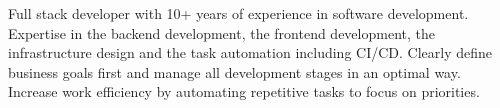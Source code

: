 

\begin{cvparagraph}

Full stack developer with 10+ years of experience in software development.
Expertise in the backend development, the frontend development, the infrastructure design and the task automation including CI/CD.
Clearly define business goals first and manage all development stages in an optimal way.
Increase work efficiency by automating repetitive tasks to focus on priorities.

\end{cvparagraph}
